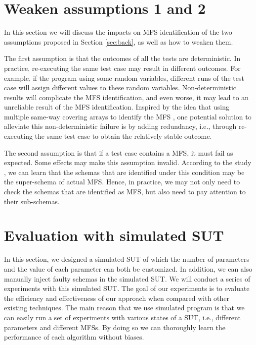 \documentclass{sig-alternate-05-2015}
\begin{document}
{{\section{Weaken assumptions 1 and 2}
In this section we will discuss the impacts on MFS identification of the two assumptions proposed in Section \ref{sec:back}, as well as how to weaken them.

The first assumption is that the outcomes of all the tests are deterministic. In practice, re-executing the same test case may result in different outcomes. For example, if the program using some random variables, different runs of the test case will assign different
values to these random variables. Non-deterministic results will complicate the MFS identification, and even worse, it may lead to an unreliable result of the MFS identification. Inspired by the idea that using multiple same-way covering arrays to identify the MFS \cite{fouche2009incremental,yilmaz2006covering}, one potential solution to alleviate this non-deterministic failure is by adding redundancy, i.e., through re-executing the same test case to obtain the relatively stable outcome.

The second assumption is that if a test case contains a MFS, it must fail as expected. Some effects \cite{Masri:2014:PCC:2582050.2559932,yilmaz2013reducing} may make this assumption invalid. According to the study \cite{zhang2011characterizing}, we can learn that the schemas that are identified under this condition may be the super-schema of actual MFS. Hence, in practice, we may not only need to check the schemas that are identified as MFS, but also need to pay attention to their sub-schemas.

\section{Evaluation with simulated SUT} \label{sec:simulateEx}
In this section, we designed a simulated SUT of which the number of parameters and the value of each parameter can both be customized. In addition, we can also manually inject faulty schemas in the simulated SUT. We will conduct a series of experiments with this simulated SUT. The goal of our experiments is to evaluate the efficiency and effectiveness of our approach when compared with other existing techniques. The main reason that we use simulated program is that we can easily run a set of experiments with various states of a SUT, i.e., different parameters and different MFSs. By doing so we can thoroughly learn the performance of each algorithm without biases.

}}
\end{document}
